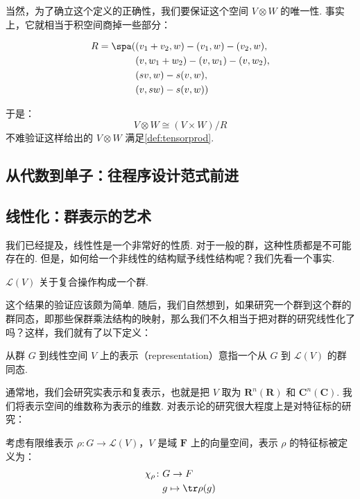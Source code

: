 当然，为了确立这个定义的正确性，我们要保证这个空间 $V \otimes W$ 的唯一性. 事实上，它就相当于积空间商掉一些部分：

\begin{align*}
    R = \spa ( & (v_1 + v_2, w) - (v_1, w) - (v_2, w), \\
               & (v, w_1 + w_2) - (v, w_1) - (v, w_2), \\
               & (sv, w) - s(v, w),                    \\
               & (v, sw) - s(v, w))
\end{align*}

于是：
\[ V \otimes W \cong (V \times W) / R \]
不难验证这样给出的 $V \otimes W$ 满足\autoref{def:tensorprod}.

\subsection{从代数到单子：往程序设计范式前进}

\subsection{线性化：群表示的艺术}

我们已经提及，线性性是一个非常好的性质. 对于一般的群，这种性质都是不可能存在的. 但是，如何给一个非线性的结构赋予线性结构呢？我们先看一个事实.

\begin{lemma}{}{}
    $\mathcal{L}(V)$ 关于复合操作构成一个群.
\end{lemma}

这个结果的验证应该颇为简单. 随后，我们自然想到，如果研究一个群到这个群的群同态，即那些保群乘法结构的映射，那么我们不久相当于把对群的研究线性化了吗？这样，我们就有了以下定义：

\begin{definition}{}{}
    从群 $G$ 到线性空间 $V$ 上的表示（representation）意指一个从 $G$ 到 $\mathcal{L}(V)$ 的群同态.
\end{definition}

通常地，我们会研究实表示和复表示，也就是把 $V$ 取为 $\mathbf{R}^n(\mathbf{R})$ 和 $\mathbf{C}^n(\mathbf{C})$. 我们将表示空间的维数称为表示的维数. 对表示论的研究很大程度上是对特征标的研究：

\begin{definition}{}{}
    考虑有限维表示 $\rho: G \to \mathcal{L}(V)$，$V$ 是域 $\mathbf{F}$ 上的向量空间，表示 $\rho$ 的特征标被定义为：
    \begin{align*}
        \chi_\rho \colon & G \to F                 \\
                         & g  \mapsto  \tr \rho(g)
    \end{align*}
\end{definition}

